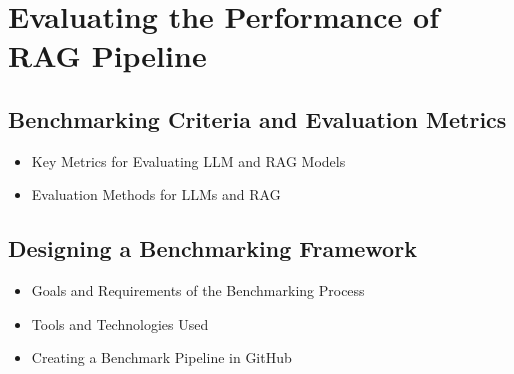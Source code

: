 \chapter{Evaluating the Performance of RAG Pipeline}

\section{Benchmarking Criteria and Evaluation Metrics}
\begin{itemize}
    \item Key Metrics for Evaluating LLM and RAG Models
    \item Evaluation Methods for LLMs and RAG
\end{itemize}

\section{Designing a Benchmarking Framework}
\begin{itemize}
    \item Goals and Requirements of the Benchmarking Process
    \item Tools and Technologies Used
    \item Creating a Benchmark Pipeline in GitHub
\end{itemize}
